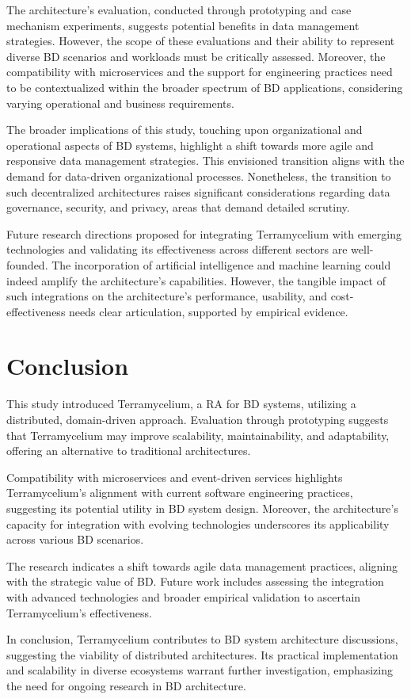 \documentclass[journal]{IEEEtran}
\begin{document}
The architecture's evaluation, conducted through prototyping and case mechanism experiments, suggests potential benefits in data management strategies. However, the scope of these evaluations and their ability to represent diverse BD scenarios and workloads must be critically assessed. Moreover, the compatibility with microservices and the support for engineering practices need to be contextualized within the broader spectrum of BD applications, considering varying operational and business requirements.

The broader implications of this study, touching upon organizational and operational aspects of BD systems, highlight a shift towards more agile and responsive data management strategies. This envisioned transition aligns with the demand for data-driven organizational processes. Nonetheless, the transition to such decentralized architectures raises significant considerations regarding data governance, security, and privacy, areas that demand detailed scrutiny.

Future research directions proposed for integrating Terramycelium with emerging technologies and validating its effectiveness across different sectors are well-founded. The incorporation of artificial intelligence and machine learning could indeed amplify the architecture's capabilities. However, the tangible impact of such integrations on the architecture's performance, usability, and cost-effectiveness needs clear articulation, supported by empirical evidence.



\section{Conclusion} \label{sec:conclusion}

This study introduced Terramycelium, a RA for BD systems, utilizing a distributed, domain-driven approach. Evaluation through prototyping suggests that Terramycelium may improve scalability, maintainability, and adaptability, offering an alternative to traditional architectures.

Compatibility with microservices and event-driven services highlights Terramycelium's alignment with current software engineering practices, suggesting its potential utility in BD system design. Moreover, the architecture's capacity for integration with evolving technologies underscores its applicability across various BD scenarios.

The research indicates a shift towards agile data management practices, aligning with the strategic value of BD. Future work includes assessing the integration with advanced technologies and broader empirical validation to ascertain Terramycelium's effectiveness.

In conclusion, Terramycelium contributes to BD system architecture discussions, suggesting the viability of distributed architectures. Its practical implementation and scalability in diverse ecosystems warrant further investigation, emphasizing the need for ongoing research in BD architecture.


\appendix







\end{document}
